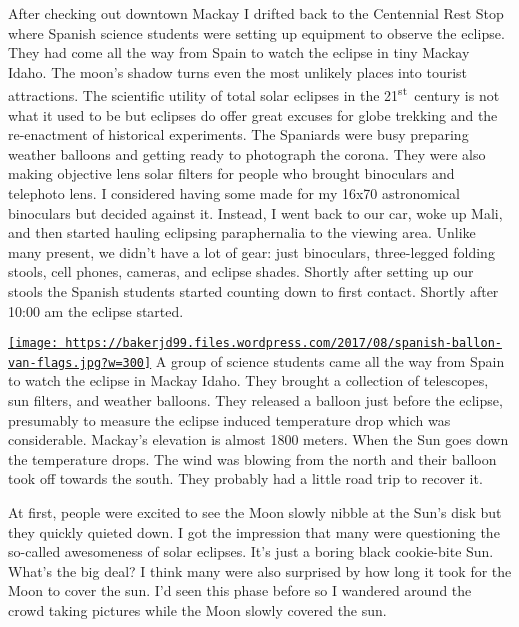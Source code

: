 After checking out downtown Mackay I drifted back to the Centennial Rest
Stop where Spanish science students were setting up equipment to observe
the eclipse. They had come all the way from Spain to watch the eclipse
in tiny Mackay Idaho. The moon's shadow turns even the most unlikely
places into tourist attractions. The scientific utility of total solar
eclipses in the 21\textsuperscript{st}~century is not what it used to be
but eclipses do offer great excuses for globe trekking and the
re-enactment of historical experiments. The Spaniards were busy
preparing weather balloons and getting ready to photograph the corona.
They were also making objective lens solar filters for people who
brought binoculars and telephoto lens. I considered having some made for
my 16x70 astronomical binoculars but decided against it. Instead, I went
back to our car, woke up Mali, and then started hauling eclipsing
paraphernalia to the viewing area. Unlike many present, we didn't have a
lot of gear: just binoculars, three-legged folding stools, cell phones,
cameras, and eclipse shades. Shortly after setting up our stools the
Spanish students started counting down to first contact. Shortly after
10:00 am the eclipse started.


\href{https://conceptcontrol.smugmug.com/Places/USA-and-Canada/Idaho-Instants/i-dGsRkQn/A}{\texttt{[image: https://bakerjd99.files.wordpress.com/2017/08/spanish-ballon-van-flags.jpg?w=300]}}
A group of science students came all the way from Spain to watch the
eclipse in Mackay Idaho. They brought a collection of telescopes, sun
filters, and weather balloons. They released a balloon just before the
eclipse, presumably to measure the eclipse induced temperature drop
which was considerable. Mackay's elevation is almost 1800 meters. When
the Sun goes down the temperature drops. The wind was blowing from the
north and their balloon took off towards the south. They probably had a
little road trip to recover it.


At first, people were excited to see the Moon slowly nibble at the Sun's
disk but they quickly quieted down. I got the impression that many were
questioning the so-called awesomeness of solar eclipses. It's just a
boring black cookie-bite Sun. What's the big deal? I think many were
also surprised by how long it took for the Moon to cover the sun. I'd
seen this phase before so I wandered around the crowd taking pictures
while the Moon slowly covered the sun.

